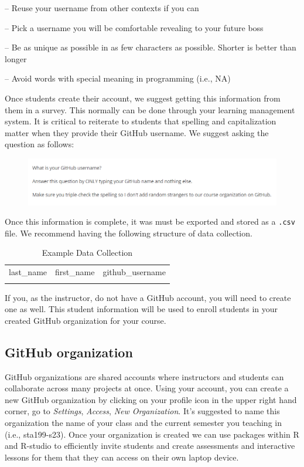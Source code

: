\documentclass[
  12pt]{article}
\begin{document}
-- Reuse your username from other contexts if you can

-- Pick a username you will be comfortable revealing to your future boss

-- Be as unique as possible in as few characters as possible. Shorter is
better than longer

-- Avoid words with special meaning in programming (i.e., NA)

Once students create their account, we suggest getting this information
from them in a survey. This normally can be done through your learning
management system. It is critical to reiterate to students that spelling
and capitalization matter when they provide their GitHub username. We
suggest asking the question as follows:

\begin{figure}

{\centering \includegraphics{images/github.question.png}

}

\end{figure}

Once this information is complete, it was must be exported and stored as
a \texttt{.csv} file. We recommend having the following structure of
data collection.

\begin{longtable}[]{@{}lll@{}}
\caption{Example Data Collection}\tabularnewline
\toprule()
\endhead
last\_name & first\_name & github\_username \\
& & \\
\bottomrule()
\end{longtable}

If you, as the instructor, do not have a GitHub account, you will need
to create one as well. This student information will be used to enroll
students in your created GitHub organization for your course.

\hypertarget{github-organization}{%
\subsection{GitHub organization}\label{github-organization}}

GitHub organizations are shared accounts where instructors and students
can collaborate across many projects at once. Using your account, you
can create a new GitHub organization by clicking on your profile icon in
the upper right hand corner, go to \emph{Settings}, \emph{Access},
\emph{New Organization}. It's suggested to name this organization the
name of your class and the current semester you teaching in (i.e.,
sta199-s23). Once your organization is created we can use packages
within R and R-studio to efficiently invite students and create
assessments and interactive lessons for them that they can access on
their own laptop device.
\end{document}
